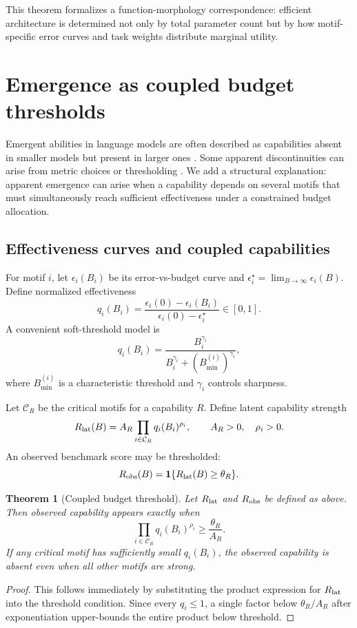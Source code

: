 \documentclass[11pt]{article}
\newtheorem{theorem}{Theorem}[section]
\theoremstyle{definition}
\newcommand{\calC}{\mathcal{C}}
\begin{document}
This theorem formalizes a function-morphology correspondence: efficient architecture is determined not only by total parameter count but by how motif-specific error curves and task weights distribute marginal utility.

\section{Emergence as coupled budget thresholds}

Emergent abilities in language models are often described as capabilities absent in smaller models but present in larger ones \cite{wei2022}. Some apparent discontinuities can arise from metric choices or thresholding \cite{schaeffer2023}. We add a structural explanation: apparent emergence can arise when a capability depends on several motifs that must simultaneously reach sufficient effectiveness under a constrained budget allocation.

\subsection{Effectiveness curves and coupled capabilities}

For motif \(i\), let \(\epsilon_i(B_i)\) be its error-vs-budget curve and \(\epsilon_i^\star=\lim_{B\to\infty}\epsilon_i(B)\). Define normalized effectiveness
\[
q_i(B_i)=\frac{\epsilon_i(0)-\epsilon_i(B_i)}{\epsilon_i(0)-\epsilon_i^\star}\in[0,1].
\]
A convenient soft-threshold model is
\[
q_i(B_i)=\frac{B_i^{\gamma_i}}{B_i^{\gamma_i}+(B_{\min}^{(i)})^{\gamma_i}},
\]
where \(B_{\min}^{(i)}\) is a characteristic threshold and \(\gamma_i\) controls sharpness.

Let \(\calC_R\) be the critical motifs for a capability \(R\). Define latent capability strength
\[
R_{\rm lat}(B)=A_R\prod_{i\in\calC_R}q_i(B_i)^{\rho_i},\qquad A_R>0,\quad \rho_i>0.
\]
An observed benchmark score may be thresholded:
\[
R_{\rm obs}(B)=\mathbf 1\{R_{\rm lat}(B)\ge \theta_R\}.
\]

\begin{theorem}[Coupled budget threshold]
Let \(R_{\rm lat}\) and \(R_{\rm obs}\) be defined as above. Then observed capability appears exactly when
\[
  \prod_{i\in\calC_R}q_i(B_i)^{\rho_i}\ge \frac{\theta_R}{A_R}.
\]
If any critical motif has sufficiently small \(q_i(B_i)\), the observed capability is absent even when all other motifs are strong.
\end{theorem}

\begin{proof}
This follows immediately by substituting the product expression for \(R_{\rm lat}\) into the threshold condition. Since every \(q_i\le 1\), a single factor below \(\theta_R/A_R\) after exponentiation upper-bounds the entire product below threshold.
\end{proof}
\end{document}
